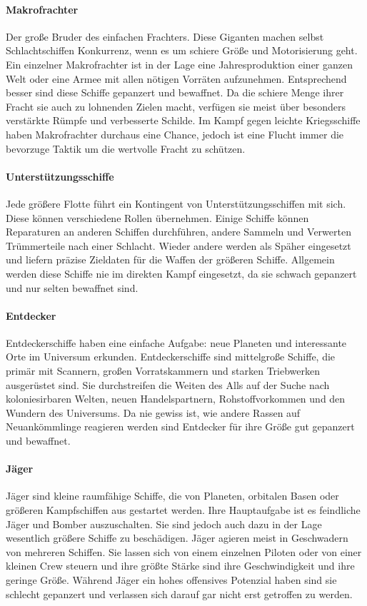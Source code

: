 \documentclass[11pt, a4paper]{article}
\begin{document}
\paragraph{Makrofrachter}
Der große Bruder des einfachen Frachters. Diese Giganten machen selbst Schlachtschiffen Konkurrenz, wenn es um
schiere Größe und Motorisierung geht. Ein einzelner Makrofrachter ist in der Lage eine Jahresproduktion einer
ganzen Welt oder eine Armee mit allen nötigen Vorräten aufzunehmen. Entsprechend besser sind diese Schiffe
gepanzert und bewaffnet. Da die schiere Menge ihrer Fracht sie auch zu lohnenden Zielen macht, verfügen sie
meist über besonders verstärkte Rümpfe und verbesserte Schilde. Im Kampf gegen leichte Kriegsschiffe haben
Makrofrachter durchaus eine Chance, jedoch ist eine Flucht immer die bevorzuge Taktik um die wertvolle Fracht
zu schützen.
%
\paragraph{Unterstützungsschiffe}
Jede größere Flotte führt ein Kontingent von Unterstützungsschiffen mit sich. Diese können verschiedene Rollen
übernehmen. Einige Schiffe können Reparaturen an anderen Schiffen durchführen, andere Sammeln und Verwerten
Trümmerteile nach einer Schlacht. Wieder andere werden als Späher eingesetzt und liefern präzise Zieldaten
für die Waffen der größeren Schiffe. Allgemein werden diese Schiffe nie im direkten Kampf eingesetzt, da sie
schwach gepanzert und nur selten bewaffnet sind.
%
\paragraph{Entdecker}
Entdeckerschiffe haben eine einfache Aufgabe: neue Planeten und interessante Orte im Universum erkunden.
Entdeckerschiffe sind mittelgroße Schiffe, die primär mit Scannern, großen Vorratskammern und starken 
Triebwerken ausgerüstet sind. Sie durchstreifen die Weiten des Alls auf der Suche nach koloniesirbaren
Welten, neuen Handelspartnern, Rohstoffvorkommen und den Wundern des Universums. Da nie gewiss ist, wie andere
Rassen auf Neuankömmlinge reagieren werden sind Entdecker für ihre Größe gut gepanzert und bewaffnet.
%
\paragraph{Jäger}
Jäger sind kleine raumfähige Schiffe, die von Planeten, orbitalen Basen oder größeren Kampfschiffen aus 
gestartet werden. Ihre Hauptaufgabe ist es feindliche Jäger und Bomber auszuschalten. Sie sind jedoch auch 
dazu in der Lage wesentlich größere Schiffe zu beschädigen. Jäger agieren meist in Geschwadern von mehreren 
Schiffen. Sie lassen sich von einem einzelnen Piloten oder von einer kleinen Crew steuern und ihre größte 
Stärke sind ihre Geschwindigkeit und ihre geringe Größe. Während Jäger ein hohes offensives Potenzial haben
sind sie schlecht gepanzert und verlassen sich darauf gar nicht erst getroffen zu werden.
%
\end{document}
